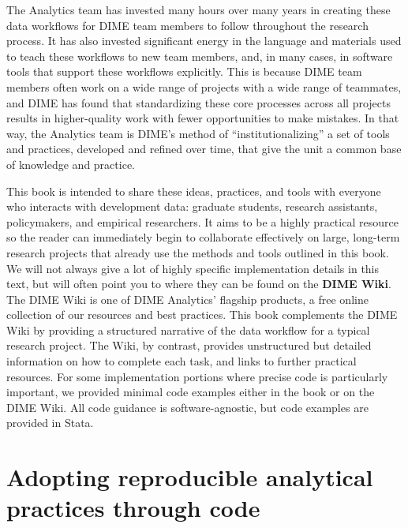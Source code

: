 The Analytics team has invested many hours over many years
in creating these data workflows for DIME team members to follow
throughout the research process.
It has also invested significant energy in the language and materials
used to teach these workflows to new team members,
and, in many cases, in software tools that support these workflows explicitly.
This is because DIME team members often work on a wide range of projects
with a wide range of teammates, and DIME has found
that standardizing these core processes across all projects
results in higher-quality work with fewer opportunities to make mistakes.
In that way, the Analytics team is DIME's method of ``institutionalizing''
a set of tools and practices, developed and refined over time,
that give the unit a common base of knowledge and practice.

This book is intended to share these ideas, practices, and tools
with everyone who interacts with development data:
graduate students, research assistants, policymakers, and empirical researchers.
It aims to be a highly practical resource so the reader can
immediately begin to collaborate effectively on large, long-term research projects
that already use the methods and tools outlined in this book.
We will not always give a lot of highly specific implementation details in this text,
but will often point you to where they can be found on the \textbf{DIME Wiki}.
The DIME Wiki is one of DIME Analytics' flagship products,
a free online collection of our resources and best practices.
This book complements the DIME Wiki by providing a structured narrative
of the data workflow for a typical research project.
The Wiki, by contrast, provides unstructured but detailed information
on how to complete each task, and links to further practical resources.
For some implementation portions where precise code is particularly important,
we provided minimal code examples either in the book or on the DIME Wiki.
All code guidance is software-agnostic, but code examples are provided in Stata.

\section{Adopting reproducible analytical practices through code}

